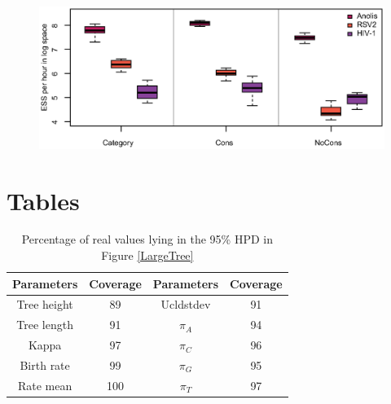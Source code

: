 \documentclass{bmcart}
\begin{document}
\begin{backmatter}
\begin{figure}[h!]
\includegraphics[width=12cm]{Fig25-UcldScalar.eps}\\
\caption{}
\label{ucldscalar}
\end{figure}

\clearpage
\section*{Tables}
\begin{table}[h!]
  \centering
\begin{tabular}{cc|cc}
\hline
Parameters&Coverage&Parameters&Coverage\\
\hline
Tree height&89&Ucldstdev&91\\
Tree length&91&${\pi_A}$&94\\
Kappa&97&${\pi_C}$&96\\
Birth rate&99&${\pi_G}$&95\\
Rate mean&100&${\pi_T}$&97\\
\hline
\end{tabular}
\caption{Percentage of real values lying in the 95\% HPD in Figure \ref{LargeTree} }\label{num_hpd}
\end{table}


\end{backmatter}
\end{document}
